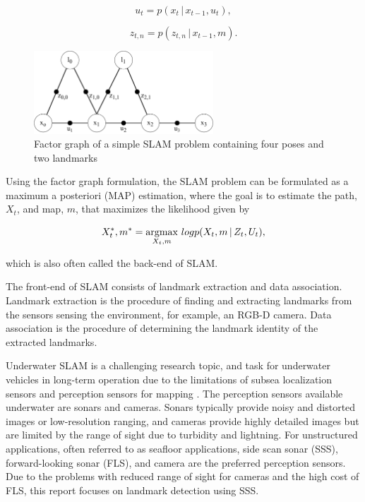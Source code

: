 \begin{equation}
    u_t = p(x_t \,|\, x_{t-1},u_t),
    \label{eq:odom_pdf}
\end{equation}

\begin{equation}
    z_{t,n} = p(z_{t,n} \,|\, x_{t-1},m).
    \label{eq:landmark_measurement_pdf}
\end{equation}

\begin{figure}
    \centering
    \includegraphics[width=0.6\textwidth]{figures/factor_graph.drawio.pdf}
    \caption{Factor graph of a simple SLAM problem containing four poses and two landmarks}
    \label{fig:factor_graph}
\end{figure}

Using the factor graph formulation, the SLAM problem can be formulated as a maximum a posteriori (MAP) estimation, where the goal is to estimate the path, $X_t$, and map, $m$, that maximizes the likelihood given by

\begin{equation}
    X_t^*, m^* = \operatorname*{argmax}_{X_t,m} \, logp(X_t,m \,|\, Z_t,U_t),
    \label{eq:SLAM}
\end{equation}

which is also often called the back-end of SLAM.

The front-end of SLAM consists of landmark extraction and data association. Landmark extraction is the procedure of finding and extracting landmarks from the sensors sensing the environment, for example, an RGB-D camera.  Data association is the procedure of determining the landmark identity of the extracted landmarks.

Underwater SLAM is a challenging research topic, and task for underwater vehicles in long-term operation due to the limitations of subsea localization sensors and perception sensors for mapping \cite{Hidalgo2015ReviewTechniques}. The perception sensors available underwater are sonars and cameras. Sonars typically provide noisy and distorted images or low-resolution ranging, and cameras provide highly detailed images but are limited by the range of sight due to turbidity and lightning. For unstructured applications, often referred to as seafloor applications, side scan sonar (SSS), forward-looking sonar (FLS), and camera are the preferred perception sensors. Due to the problems with reduced range of sight for cameras and the high cost of FLS, this report focuses on landmark detection using SSS.

